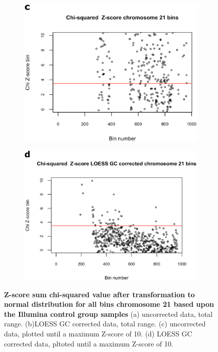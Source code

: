 \begin{figure}[!h]
\begin{subfigure}{.5\textwidth}
		\label{fig:NIPT_Supp1_Fig1_3b}
	\end{subfigure}
	\begin{subfigure}{.5\textwidth}
		\centering
		\includegraphics[width=1\linewidth]{img/NIPT_Supp1_Fig1_3c}
		\label{fig:NIPT_Supp1_Fig1_3c}
	\end{subfigure} 
	\begin{subfigure}{.5\textwidth}
		\centering
		\includegraphics[width=1\linewidth]{img/NIPT_Supp1_Fig1_3d}
		\label{fig:NIPT_Supp1_Fig1_3d}
	\end{subfigure}  
	\caption[Example Z-score normal distribution sum chi-squared value]{\textbf{Z-score sum chi-squared value after transformation to normal distribution for all bins chromosome 21 based upon the Illumina control group samples} (a) uncorrected data, total range. (b)LOESS GC corrected data, total range. (c) uncorrected data, plotted until a maximum Z-score of 10. (d) LOESS GC corrected data, pltoted until a maximum Z-score of 10.}
	\label{fig:NIPT_Supp1_Fig1_3}
\end{figure}

